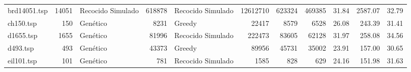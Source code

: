 \begin{table}[hbtp]
{{\begin{tabular}{lrlrlrrrrrr}
\cellcolor[HTML]{C0C0C0}brd14051.tsp & 14051                          & Recocido Simulado                                                                                                           & 618878                                                                          & Recocido Simulado                                               & 12612710                         & 623324                          & 469385                           & 31.84                                   & 2587.07                               & 32.79                         \\
\cellcolor[HTML]{C0C0C0}ch150.tsp    & 150                            & Genético                                                                                                                    & 8231                                                                            & Greedy                                                          & 22417                            & 8579                            & 6528                             & 26.08                                   & 243.39                                & 31.41                         \\
\cellcolor[HTML]{C0C0C0}d1655.tsp    & 1655                           & Genético                                                                                                                    & 81996                                                                           & Recocido Simulado                                               & 222473                           & 83605                           & 62128                            & 31.97                                   & 258.08                                & 34.56                         \\
\cellcolor[HTML]{C0C0C0}d493.tsp     & 493                            & Genético                                                                                                                    & 43373                                                                           & Greedy                                                          & 89956                            & 45731                           & 35002                            & 23.91                                   & 157.00                                & 30.65                         \\
\cellcolor[HTML]{C0C0C0}eil101.tsp   & 101                            & Genético                                                                                                                    & 781                                                                             & Recocido Simulado                                               & 1585                             & 828                             & 629                              & 24.16                                   & 151.98                                & 31.63                         \\

\end{tabular}}}
\end{table}
